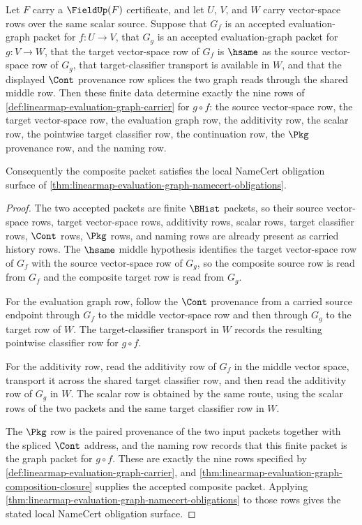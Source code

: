 \begin{theorem}
\label{thm:linearmap-evaluation-graph-composition-closure-proof-interface}
Let $F$ carry a $\FieldUp(F)$ certificate, and let $U$, $V$, and $W$ carry vector-space rows over the same scalar source. Suppose that $G_f$ is an accepted evaluation-graph packet for $f:U\to V$, that $G_g$ is an accepted evaluation-graph packet for $g:V\to W$, that the target vector-space row of $G_f$ is $\hsame$ as the source vector-space row of $G_g$, that target-classifier transport is available in $W$, and that the displayed $\Cont$ provenance row splices the two graph reads through the shared middle row. Then these finite data determine exactly the nine rows of \autoref{def:linearmap-evaluation-graph-carrier} for $g\circ f$: the source vector-space row, the target vector-space row, the evaluation graph row, the additivity row, the scalar row, the pointwise target classifier row, the continuation row, the $\Pkg$ provenance row, and the naming row.

Consequently the composite packet satisfies the local NameCert obligation surface of \autoref{thm:linearmap-evaluation-graph-namecert-obligations}.
\end{theorem}
\begin{proof}
The two accepted packets are finite $\BHist$ packets, so their source vector-space rows, target vector-space rows, additivity rows, scalar rows, target classifier rows, $\Cont$ rows, $\Pkg$ rows, and naming rows are already present as carried history rows. The $\hsame$ middle hypothesis identifies the target vector-space row of $G_f$ with the source vector-space row of $G_g$, so the composite source row is read from $G_f$ and the composite target row is read from $G_g$.

For the evaluation graph row, follow the $\Cont$ provenance from a carried source endpoint through $G_f$ to the middle vector-space row and then through $G_g$ to the target row of $W$. The target-classifier transport in $W$ records the resulting pointwise classifier row for $g\circ f$.

For the additivity row, read the additivity row of $G_f$ in the middle vector space, transport it across the shared target classifier row, and then read the additivity row of $G_g$ in $W$. The scalar row is obtained by the same route, using the scalar rows of the two packets and the same target classifier row in $W$.

The $\Pkg$ row is the paired provenance of the two input packets together with the spliced $\Cont$ address, and the naming row records that this finite packet is the graph packet for $g\circ f$. These are exactly the nine rows specified by \autoref{def:linearmap-evaluation-graph-carrier}, and \autoref{thm:linearmap-evaluation-graph-composition-closure} supplies the accepted composite packet. Applying \autoref{thm:linearmap-evaluation-graph-namecert-obligations} to those rows gives the stated local NameCert obligation surface.
\end{proof}

